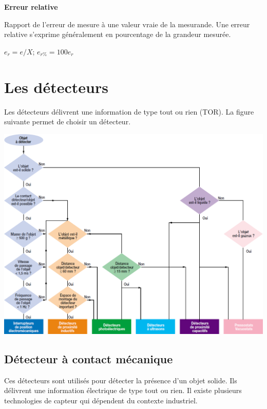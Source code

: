 \documentclass[10pt]{article}
\begin{document}
\begin{defi}
\textbf{Erreur relative}

Rapport de l'erreur de mesure à une valeur vraie de la mesurande. Une erreur relative s'exprime généralement en pourcentage de la grandeur mesurée. 


$e_r=e/X$; $e_{r\%}=100 e_r$
\end{defi}



\section{Les détecteurs}
Les détecteurs délivrent une information de type tout ou rien (TOR). La figure suivante permet de choisir un détecteur.

\begin{center}
    \includegraphics[width=.9\textwidth]{images/organigramme}
\end{center}

\subsection{Détecteur à contact mécanique}
Ces détecteurs sont utilisés pour détecter la présence d'un objet solide. Ils délivrent une information électrique de type tout ou rien. Il existe plusieurs technologies de capteur qui dépendent du contexte industriel.
\end{document}
